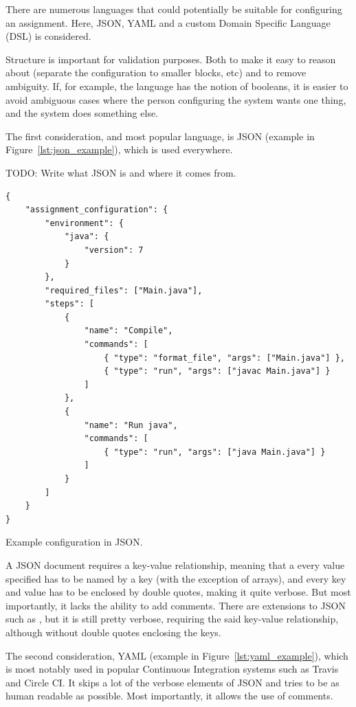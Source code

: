 There are numerous languages that could potentially be suitable for configuring an assignment. Here, JSON, YAML and a custom Domain Specific Language (DSL) is considered.

Structure is important for validation purposes. Both to make it easy to reason about (separate the configuration to smaller blocks, etc) and to remove ambiguity. If, for example, the language has the notion of booleans, it is easier to avoid ambiguous cases where the person configuring the system wants one thing, and the system does something else.

The first consideration, and most popular language, is JSON (example in Figure~\ref{lst:json_example}), which is used everywhere.

TODO: Write what JSON is and where it comes from.

\begin{listing}
\begin{verbatim}
{
    "assignment_configuration": {
        "environment": {
            "java": {
                "version": 7
            }
        },
        "required_files": ["Main.java"],
        "steps": [
            {
                "name": "Compile",
                "commands": [
                    { "type": "format_file", "args": ["Main.java"] },
                    { "type": "run", "args": ["javac Main.java"] }
                ]
            },
            {
                "name": "Run java",
                "commands": [
                    { "type": "run", "args": ["java Main.java"] }
                ]
            }
        ]
    }
}
\end{verbatim}
\caption{Example configuration in JSON.}
\label{lst:json_example}
\end{listing}

A JSON document requires a key-value relationship, meaning that a every value specified has to be named by a key (with the exception of arrays), and every key and value has to be enclosed by double quotes, making it quite verbose. But most importantly, it lacks the ability to add comments. There are extensions to JSON such as \cite{2012JSON5}, but it is still pretty verbose, requiring the said key-value relationship, although without double quotes enclosing the keys.

The second consideration, YAML (example in Figure~\ref{lst:yaml_example}), which is most notably used in popular Continuous Integration systems such as Travis and Circle CI. It skips a lot of the verbose elements of JSON and tries to be as human readable as possible. Most importantly, it allows the use of comments.

